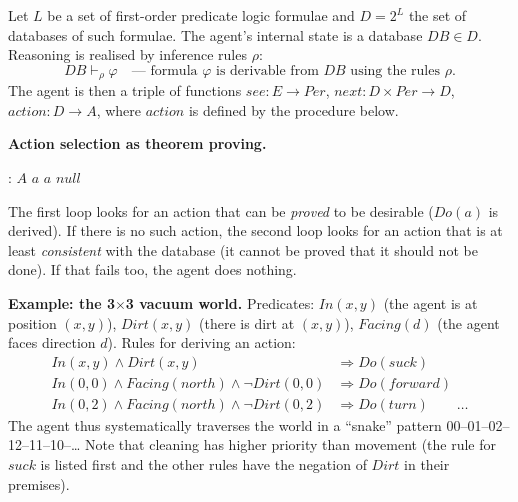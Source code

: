 \documentclass[11pt,a4paper]{article}
\theoremstyle{definition}
\providecommand{\uv}[1]{``#1''}
\begin{document}
\begin{defbox}
Let $L$ be a set of first-order predicate logic formulae and $D = 2^L$ the set of databases of
such formulae. The agent's internal state is a database $\mathit{DB} \in D$. Reasoning is realised
by inference rules $\rho$:
\[
\mathit{DB} \vdash_\rho \varphi \quad\text{---\ formula } \varphi \text{ is derivable from }
\mathit{DB} \text{ using the rules } \rho .
\]
The agent is then a triple of functions
$\mathit{see} : E \to \mathit{Per}$, $\mathit{next} : D \times \mathit{Per} \to D$,
$\mathit{action} : D \to A$, where $\mathit{action}$ is defined by the procedure below.
\end{defbox}

\noindent\textbf{Action selection as theorem proving.}
\begin{algorithmic}[1]
 : $A$
     \Return $a$ \EndIf
  \EndFor
     \Return $a$ \EndIf
  \EndFor
  \State \Return $\mathit{null}$
\EndFunction
\end{algorithmic}

The first loop looks for an action that can be \emph{proved} to be desirable ($\mathit{Do}(a)$ is
derived). If there is no such action, the second loop looks for an action that is at least
\emph{consistent} with the database (it cannot be proved that it should not be done). If that fails
too, the agent does nothing.

\medskip
\noindent\textbf{Example: the 3$\times$3 vacuum world.}
Predicates: $\mathit{In}(x,y)$ (the agent is at position $(x,y)$), $\mathit{Dirt}(x,y)$ (there is
dirt at $(x,y)$), $\mathit{Facing}(d)$ (the agent faces direction $d$). Rules for deriving an
action:
\begin{align*}
\mathit{In}(x,y) \wedge \mathit{Dirt}(x,y) &\Rightarrow \mathit{Do}(\mathit{suck}) \\
\mathit{In}(0,0) \wedge \mathit{Facing}(\mathit{north}) \wedge \neg\mathit{Dirt}(0,0)
  &\Rightarrow \mathit{Do}(\mathit{forward}) \\
\mathit{In}(0,2) \wedge \mathit{Facing}(\mathit{north}) \wedge \neg\mathit{Dirt}(0,2)
  &\Rightarrow \mathit{Do}(\mathit{turn}) \qquad \dots
\end{align*}
The agent thus systematically traverses the world in a \uv{snake} pattern
00--01--02--12--11--10--\dots
Note that cleaning has higher priority than movement (the rule for $\mathit{suck}$ is listed first
and the other rules have the negation of $\mathit{Dirt}$ in their premises).
\end{document}
